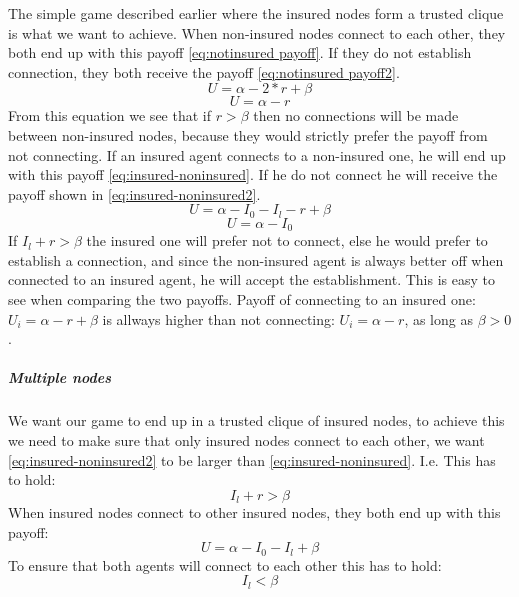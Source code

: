 The simple game described earlier where the insured nodes form a trusted clique is what we want to achieve. 
When non-insured nodes connect to each other, they both end up with this payoff \ref{eq:notinsured payoff}. If they do not establish connection, they both receive the payoff \ref{eq:notinsured payoff2}.
\begin{equation}
U=\alpha - 2*r +\beta
\label{eq:notinsured payoff}
\end{equation}
\begin{equation}
U=\alpha - r
\label{eq:notinsured payoff2}
\end{equation}
From this equation we see that if $r>\beta$ then no connections will be made between non-insured nodes, because they would strictly prefer the payoff from not connecting.
If an insured agent connects to a non-insured one, he will end up with this payoff \ref{eq:insured-noninsured}. If he do not connect he will receive the payoff shown in \ref{eq:insured-noninsured2}.
\begin{equation}
U=\alpha - I_{0} - I_{l} - r + \beta
\label{eq:insured-noninsured}
\end{equation}
\begin{equation}
U=\alpha - I_{0}
\label{eq:insured-noninsured2}
\end{equation}
If $I_{l}+r>\beta$ the insured one will prefer not to connect, else he would prefer to establish a connection, and since the non-insured agent is always better off when connected to an insured agent, he will accept the establishment. This is easy to see when comparing the two payoffs. Payoff of connecting to an insured one: $U_{i}=\alpha - r + \beta$ is allways higher than not connecting: $U_{i}=\alpha - r$, as long as $\beta>0$.
\subparagraph{Multiple nodes}
We want our game to end up in a trusted clique of insured nodes, to achieve this we need to make sure that only insured nodes connect to each other, we want \ref{eq:insured-noninsured2} to be larger than \ref{eq:insured-noninsured}. I.e. This has to hold:
\begin{equation}
I_{l}+r>\beta
\label{eq:condition}
\end{equation}
When insured nodes connect to other insured nodes, they both end up with this payoff:
\begin{equation}
U=\alpha - I_{0} - I_{l} + \beta
\label{eq:insured-insured}
\end{equation}
To ensure that both agents will connect to each other this has to hold:
 \begin{equation}
I_{l}<\beta
\label{eq:condition2}
\end{equation}
